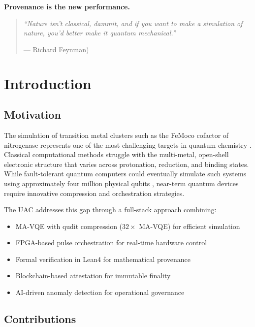 \documentclass[11pt,a4paper]{article}
\theoremstyle{plain}
\begin{document}
\clearpage
\clearpage
\thispagestyle{empty}
\begin{center}
    \Large\textbf{Provenance is the new performance.}
\end{center}

\vspace{2em}

\begin{quotation}
\emph{“Nature isn't classical, dammit, and if you want to make a simulation of nature, you'd better make it quantum mechanical.”}
\begin{flushright}— Richard Feynman)\end{flushright}
\end{quotation}

\section{Introduction}

\subsection{Motivation}

The simulation of transition metal clusters such as the FeMoco cofactor of nitrogenase represents one of the most challenging targets in quantum chemistry \cite{feMocoBenchmark}. Classical computational methods struggle with the multi-metal, open-shell electronic structure that varies across protonation, reduction, and binding states. While fault-tolerant quantum computers could eventually simulate such systems using approximately four million physical qubits \cite{surfaceCodeEstimates}, near-term quantum devices require innovative compression and orchestration strategies.

The UAC addresses this gap through a full-stack approach combining:
\begin{itemize}
    \item MA-VQE with qudit compression ($32\times$ MA-VQE) for efficient simulation
    \item FPGA-based pulse orchestration for real-time hardware control
    \item Formal verification in Lean4 for mathematical provenance
    \item Blockchain-based attestation for immutable finality
    \item AI-driven anomaly detection for operational governance
\end{itemize}

\subsection{Contributions}
\end{document}
